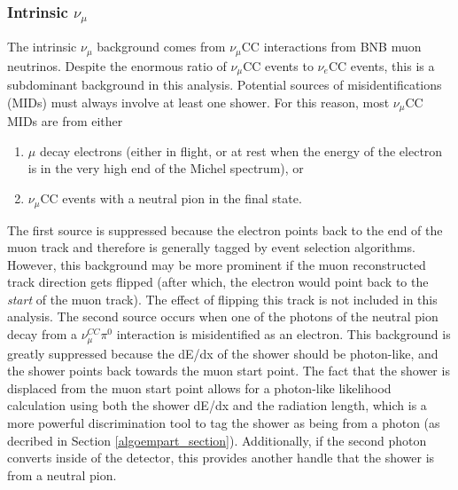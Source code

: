 \subsubsection{Intrinsic $\nu_\mu$}
The intrinsic $\nu_\mu$ background comes from $\nu_\mu$CC interactions from BNB muon neutrinos. Despite the enormous ratio of $\nu_\mu$CC events to $\nu_e$CC events, this is a subdominant background in this analysis. Potential sources of misidentifications (MIDs) must always involve at least one shower. For this reason, most $\nu_\mu$CC MIDs are from either
\begin{enumerate}
\item $\mu$ decay electrons (either in flight, or at rest when the energy of the electron is in the very high end of the Michel spectrum), or 
\item $\nu_\mu$CC events with a neutral pion in the final state. 
\end{enumerate}
The first source is suppressed because the electron points back to the end of the muon track and therefore is generally tagged by event selection algorithms. However, this background may be more prominent if the muon reconstructed track direction gets flipped (after which, the electron would point back to the \textit{start} of the muon track). The effect of flipping this track is not included in this analysis. The second source occurs when one of the photons of the neutral pion decay from a $\nu_\mu^{CC}\pi^0$ interaction is misidentified as an electron. This background is greatly suppressed because the dE/dx of the shower should be photon-like, and the shower points back towards the muon start point. The fact that the shower is displaced from the muon start point allows for a photon-like likelihood calculation using both the shower dE/dx and the radiation length, which is a more powerful discrimination tool to tag the shower as being from a photon (as decribed in Section \ref{algoempart_section}). Additionally, if the second photon converts inside of the detector, this provides another handle that the shower is from a neutral pion.

